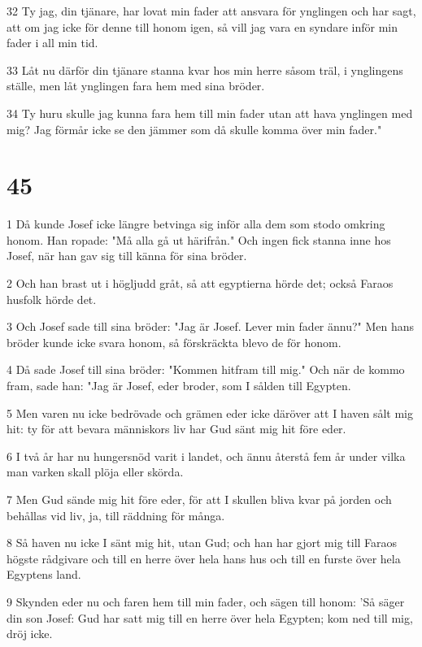\par 32 Ty jag, din tjänare, har lovat min fader att ansvara för ynglingen och har sagt, att om jag icke för denne till honom igen, så vill jag vara en syndare inför min fader i all min tid.
\par 33 Låt nu därför din tjänare stanna kvar hos min herre såsom träl, i ynglingens ställe, men låt ynglingen fara hem med sina bröder.
\par 34 Ty huru skulle jag kunna fara hem till min fader utan att hava ynglingen med mig? Jag förmår icke se den jämmer som då skulle komma över min fader."

\chapter{45}

\par 1 Då kunde Josef icke längre betvinga sig inför alla dem som stodo omkring honom. Han ropade: "Må alla gå ut härifrån." Och ingen fick stanna inne hos Josef, när han gav sig till känna för sina bröder.
\par 2 Och han brast ut i högljudd gråt, så att egyptierna hörde det; också Faraos husfolk hörde det.
\par 3 Och Josef sade till sina bröder: "Jag är Josef. Lever min fader ännu?" Men hans bröder kunde icke svara honom, så förskräckta blevo de för honom.
\par 4 Då sade Josef till sina bröder: "Kommen hitfram till mig." Och när de kommo fram, sade han: "Jag är Josef, eder broder, som I sålden till Egypten.
\par 5 Men varen nu icke bedrövade och grämen eder icke däröver att I haven sålt mig hit: ty för att bevara människors liv har Gud sänt mig hit före eder.
\par 6 I två år har nu hungersnöd varit i landet, och ännu återstå fem år under vilka man varken skall plöja eller skörda.
\par 7 Men Gud sände mig hit före eder, för att I skullen bliva kvar på jorden och behållas vid liv, ja, till räddning för många.
\par 8 Så haven nu icke I sänt mig hit, utan Gud; och han har gjort mig till Faraos högste rådgivare och till en herre över hela hans hus och till en furste över hela Egyptens land.
\par 9 Skynden eder nu och faren hem till min fader, och sägen till honom: 'Så säger din son Josef: Gud har satt mig till en herre över hela Egypten; kom ned till mig, dröj icke.
